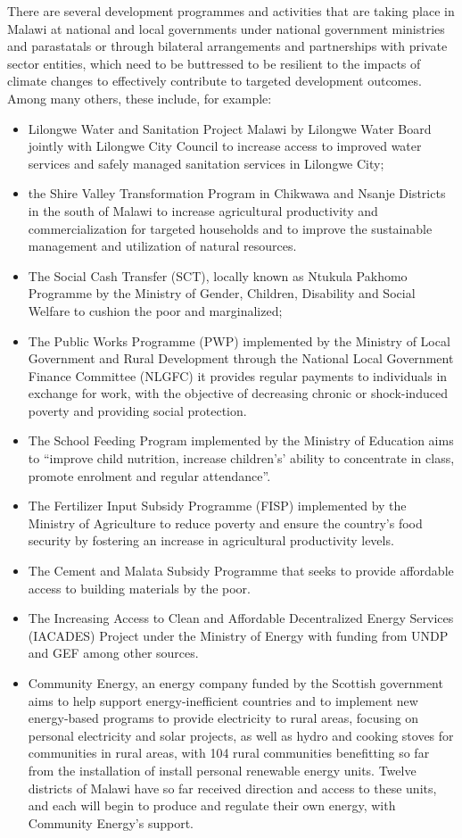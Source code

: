 \documentclass[
]{book}
\providecommand{\tightlist}{%
  \setlength{\itemsep}{0pt}\setlength{\parskip}{0pt}}
\begin{document}
There are several development programmes and activities that are taking place in Malawi at national and local governments under national government ministries and parastatals or through bilateral arrangements and partnerships with private sector entities, which need to be buttressed to be resilient to the impacts of climate changes to effectively contribute to targeted development outcomes. Among many others, these include, for example:

\begin{itemize}
\tightlist
\item
  Lilongwe Water and Sanitation Project Malawi by Lilongwe Water Board jointly with Lilongwe City Council to increase access to improved water services and safely managed sanitation services in Lilongwe City;
\item
  the Shire Valley Transformation Program in Chikwawa and Nsanje Districts in the south of Malawi to increase agricultural productivity and commercialization for targeted households and to improve the sustainable management and utilization of natural resources.
\item
  The Social Cash Transfer (SCT), locally known as Ntukula Pakhomo Programme by the Ministry of Gender, Children, Disability and Social Welfare to cushion the poor and marginalized;
\item
  The Public Works Programme (PWP) implemented by the Ministry of Local Government and Rural Development through the National Local Government Finance Committee (NLGFC) it provides regular payments to individuals in exchange for work, with the objective of decreasing chronic or shock-induced poverty and providing social protection.
\item
  The School Feeding Program implemented by the Ministry of Education aims to ``improve child nutrition, increase children's' ability to concentrate in class, promote enrolment and regular attendance''.
\item
  The Fertilizer Input Subsidy Programme (FISP) implemented by the Ministry of Agriculture to reduce poverty and ensure the country's food security by fostering an increase in agricultural productivity levels.
\item
  The Cement and Malata Subsidy Programme that seeks to provide affordable access to building materials by the poor.
\item
  The Increasing Access to Clean and Affordable Decentralized Energy Services (IACADES) Project under the Ministry of Energy with funding from UNDP and GEF among other sources.
\item
  Community Energy, an energy company funded by the Scottish government aims to help support energy-inefficient countries and to implement new energy-based programs to provide electricity to rural areas, focusing on personal electricity and solar projects, as well as hydro and cooking stoves for communities in rural areas, with 104 rural communities benefitting so far from the installation of install personal renewable energy units. Twelve districts of Malawi have so far received direction and access to these units, and each will begin to produce and regulate their own energy, with Community Energy's support.
\end{itemize}
\end{document}
